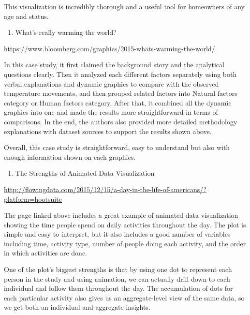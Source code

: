 \documentclass[]{book}
\providecommand{\tightlist}{%
  \setlength{\itemsep}{0pt}\setlength{\parskip}{0pt}}
\theoremstyle{definition}
\theoremstyle{definition}
\theoremstyle{definition}
\theoremstyle{remark}
\begin{document}
This visualization is incredibly thorough and a useful tool for
homeowners of any age and status.

\begin{enumerate}
\def\labelenumi{\arabic{enumi}.}
\setcounter{enumi}{5}
\tightlist
\item
  What's really warming the world?
\end{enumerate}

\url{https://www.bloomberg.com/graphics/2015-whats-warming-the-world/}

In this case study, it first claimed the background story and the
analytical questions clearly. Then it analyzed each different factors
separately using both verbal explanations and dynamic graphics to
compare with the observed temperature movements, and then grouped
related factors into Natural factors category or Human factors category.
After that, it combined all the dynamic graphics into one and made the
results more straightforward in terms of comparisons. In the end, the
authors also provided more detailed methodology explanations with
dataset sources to support the results shown above.

Overall, this case study is straightforward, easy to understand but also
with enough information shown on each graphics.

\begin{enumerate}
\def\labelenumi{\arabic{enumi}.}
\setcounter{enumi}{6}
\tightlist
\item
  The Strengths of Animated Data Visualization
\end{enumerate}

\url{http://flowingdata.com/2015/12/15/a-day-in-the-life-of-americans/?platform=hootsuite}

The page linked above includes a great example of animated data
visualization showing the time people spend on daily activities
throughout the day. The plot is simple and easy to interpret, but it
also includes a good number of variables including time, activity type,
number of people doing each activity, and the order in which activities
are done.

One of the plot's biggest strengths is that by using one dot to
represent each person in the study and using animation, we can actually
drill down to each individual and follow them throughout the day. The
accumulation of dots for each particular activity also gives us an
aggregate-level view of the same data, so we get both an individual and
aggregate insights.
\end{document}
